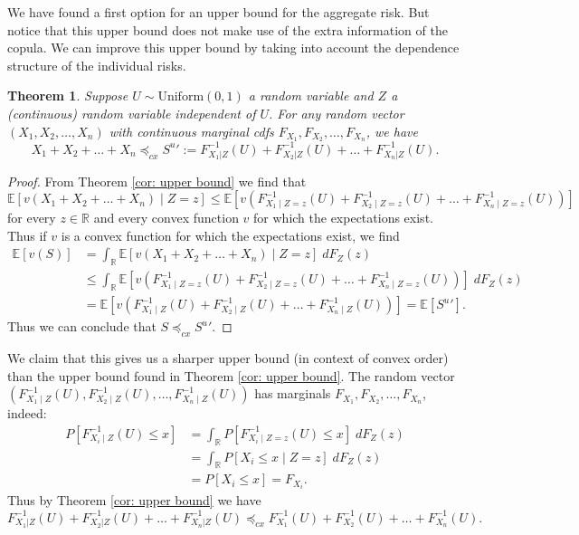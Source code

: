 \documentclass{article}
\newtheorem{theorem}{Theorem}
\begin{document}
We have found a first option for an upper bound for the aggregate risk. But notice that this upper bound does not make use of the extra information of the copula. We can improve this upper bound by taking into account the dependence structure of the individual risks.
\\
\begin{theorem}\cite[Proposition 2]{kaas-2000}
    Suppose $U\sim \text{Uniform}(0,1)$ a random variable and $Z$ a (continuous) random variable independent of $U$. For any random vector $(X_1,X_2,\dots,X_n)$ with continuous marginal cdfs $F_{X_1},F_{X_2},\dots,F_{X_n}$, we have
    $$X_1 + X_2 + \dots + X_n \preceq_{cx} {S^u}' := F^{-1}_{X_1|Z}(U) + F^{-1}_{X_2|Z}(U) + \dots + F^{-1}_{X_n|Z}(U).$$
\end{theorem}
\begin{proof}
    From Theorem \ref{cor: upper bound} we find that
    $$\mathbb{E}[v(X_1 + X_2 + \dots +X_n) \mid Z = z] \leq \mathbb{E}\left[v\left(F_{X_1\mid Z = z}^{-1}(U) + F_{X_2\mid Z = z}^{-1}(U) + \dots + F_{X_n\mid Z= z}^{-1}(U)\right)\right]$$
    for every $z\in \mathbb{R}$ and every convex function $v$ for which the expectations exist. Thus if $v$ is a convex function for which the expectations exist, we find
    \begin{align*}
        \mathbb{E}[v(S)] &= \int_\mathbb{R}\mathbb{E}[v(X_1 + X_2 + \dots + X_n)\mid Z = z] \;dF_Z(z)\\
        &\leq \int_\mathbb{R}\mathbb{E}\left[v\left(F_{X_1\mid Z = z}^{-1}(U) + F_{X_2\mid Z = z}^{-1}(U) + \dots + F_{X_n\mid Z= z}^{-1}(U)\right)\right] \;dF_Z(z)\\
        &= \mathbb{E}\left[v\left(F_{X_1\mid Z}^{-1}(U) + F_{X_2\mid Z}^{-1}(U) + \dots + F_{X_n\mid Z}^{-1}(U)\right)\right] = \mathbb{E}[{S^u}'].
    \end{align*}
    Thus we can conclude that $S \preceq_{cx} {S^u}'$.
\end{proof}

We claim that this gives us a sharper upper bound (in context of convex order) than the upper bound found in Theorem \ref{cor: upper bound}. The random vector $\left(F_{X_1\mid Z}^{-1}(U),F_{X_2\mid Z}^{-1}(U), \dots, F_{X_n\mid Z}^{-1}(U)\right)$ has marginals $F_{X_1},F_{X_2},\dots,F_{X_n}$, indeed:
\begin{align*}
    P\left[F_{X_i\mid Z}^{-1}(U) \leq x\right] &= \int_\mathbb{R} P\left[F_{X_i\mid Z = z}^{-1}(U) \leq x\right] \; dF_Z(z)\\
    &= \int_\mathbb{R} P\left[X_i\leq x\mid Z = z\right] \; dF_Z(z)\\
    &= P[X_i \leq x] = F_{X_i}.
\end{align*}
Thus by Theorem \ref{cor: upper bound} we have
$$F^{-1}_{X_1|Z}(U) + F^{-1}_{X_2|Z}(U) + \dots + F^{-1}_{X_n|Z}(U) \preceq_{cx} F_{X_1}^{-1}(U) + F_{X_2}^{-1}(U) + \dots + F_{X_n}^{-1}(U).$$
\end{document}
